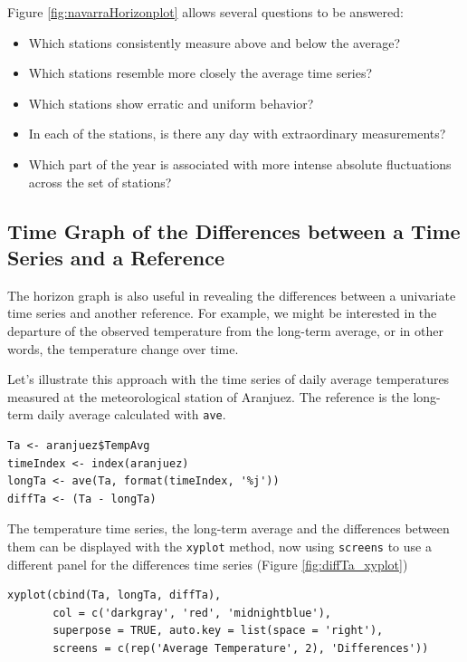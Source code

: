 \documentclass[smallroyalvopaper]{memoir}
\begin{document}
Figure \ref{fig:navarraHorizonplot} allows several questions to be
answered:
\begin{itemize}
\item Which stations consistently measure above and below the average?
\item Which stations resemble more closely the average time series?
\item Which stations show erratic and uniform behavior?
\item In each of the stations, is there any day with extraordinary measurements?
\item Which part of the year is associated with more intense
absolute fluctuations across the set of stations?
\end{itemize}

\subsection{Time Graph of the Differences between a Time Series and a Reference \label{sec:differences}}
\label{sec:org9df903c}

The horizon graph is also useful in revealing the differences between
a univariate time series and another reference. For example, we
might be interested in the departure of the observed temperature
from the long-term average, or in other words, the temperature
change over time.

Let's illustrate this approach with the time series of daily
average temperatures measured at the meteorological station of
Aranjuez. The reference is the long-term daily average calculated
with \texttt{ave}.

\lstset{language=r,label= ,caption= ,captionpos=b,numbers=none}
\begin{lstlisting}
Ta <- aranjuez$TempAvg
timeIndex <- index(aranjuez)
longTa <- ave(Ta, format(timeIndex, '%j'))
diffTa <- (Ta - longTa)
\end{lstlisting}


The temperature time series, the long-term average and the
differences between them can be displayed with the \texttt{xyplot}
method, now using \texttt{screens} to use a different panel for the
differences time series (Figure \ref{fig:diffTa_xyplot})
\lstset{language=r,label= ,caption= ,captionpos=b,numbers=none}
\begin{lstlisting}
xyplot(cbind(Ta, longTa, diffTa),
       col = c('darkgray', 'red', 'midnightblue'),
       superpose = TRUE, auto.key = list(space = 'right'),
       screens = c(rep('Average Temperature', 2), 'Differences'))
\end{lstlisting}
\end{document}
